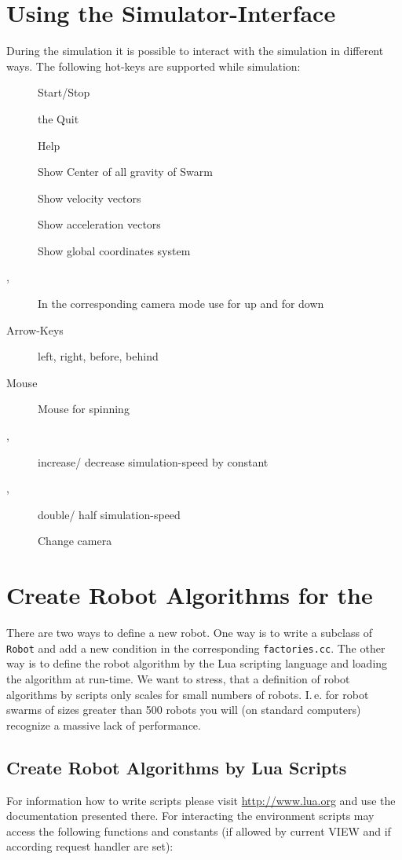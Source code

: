 \documentclass[a4paper,halfparskip,11pt,twoside]{scrartcl}
\begin{document}
\section{Using the Simulator-Interface}
During the simulation it is possible to interact with the simulation in different ways. The following hot-keys are supported while simulation:

\begin{description}
	\item [] Start/Stop
	\item [] the Quit \RSS\
	\item [] Help
	\item [] Show Center of all gravity of Swarm
	\item [] Show velocity vectors
	\item [] Show acceleration vectors
	\item [] Show global coordinates system
	\item [,] In the corresponding camera mode use  for up  and  for down
	\item [Arrow-Keys] left, right, before, behind
	\item [Mouse] Mouse for spinning
	\item [\fbox{\tt +}, \fbox{\tt -}] increase/ decrease simulation-speed by constant
	\item [\fbox{\tt *},\fbox{\tt /}] double/ half simulation-speed
	\item [] Change camera
\end{description}

\section{Create Robot Algorithms for the \RSS}
There are two ways to define a new robot. One way is to write a subclass of \texttt{Robot} and add a new condition in the corresponding \texttt{factories.cc}. The other way is to define the robot algorithm by the {\sffamily Lua} scripting language and loading the algorithm at run-time. We want to stress, that a definition of robot algorithms by \Lua scripts only scales for small numbers of robots. I.\,e. for robot swarms of sizes greater than 500 robots you will (on standard computers) recognize a massive lack of performance.

\subsection{Create Robot Algorithms by Lua Scripts}
For information how to write \Lua scripts please visit \url{http://www.lua.org} and use the documentation presented there. For interacting the environment \Lua scripts may access the following functions and constants (if allowed by current VIEW and if according request handler are set):
\end{document}
